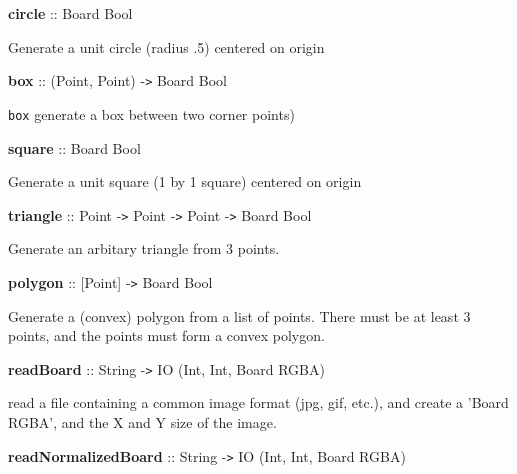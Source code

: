  

{{\bf circle} :: Board Bool}

\hspace{0.05\textwidth}\begin{minipage}{0.9\textwidth}Generate a unit circle (radius .5) centered on origin\end{minipage}

 

{{\bf box} :: (Point, Point) -{\tt >} Board Bool}

\hspace{0.05\textwidth}\begin{minipage}{0.9\textwidth}{\tt box} generate a box between two corner points)\end{minipage}

 

{{\bf square} :: Board Bool}

\hspace{0.05\textwidth}\begin{minipage}{0.9\textwidth}Generate a unit square (1 by 1 square) centered on origin\end{minipage}

 

{{\bf triangle} :: Point -{\tt >} Point -{\tt >} Point -{\tt >} Board Bool}

\hspace{0.05\textwidth}\begin{minipage}{0.9\textwidth}Generate an arbitary triangle from 3 points.\end{minipage}

 

{{\bf polygon} :: [Point] -{\tt >} Board Bool}

\hspace{0.05\textwidth}\begin{minipage}{0.9\textwidth}Generate a (convex) polygon from a list of points. There must be at least 3 points, and the points must form a convex polygon.
\end{minipage}

 

{{\bf readBoard} :: String -{\tt >} IO (Int, Int, Board RGBA)}

\hspace{0.05\textwidth}\begin{minipage}{0.9\textwidth}read a file containing a common image format (jpg, gif, etc.), and create a 'Board RGBA', and the X and Y size of the image.\end{minipage}

 

{{\bf readNormalizedBoard} :: String -{\tt >} IO (Int, Int, Board RGBA)}

 

 

